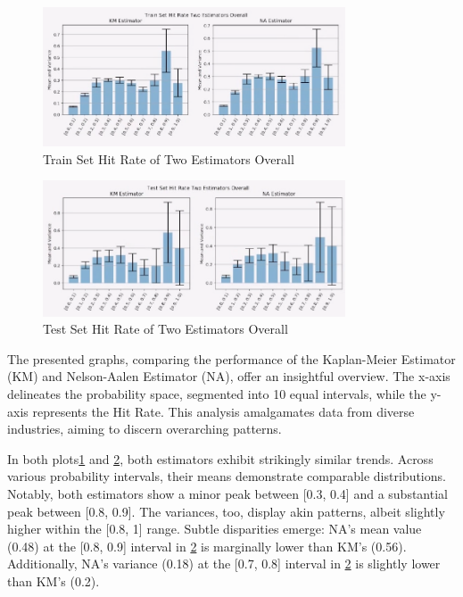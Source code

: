 \begin{figure}[H]
    \centering
    \includegraphics[width=0.8\textwidth]{figures/jpm/10. Train Set Hit Rate Two Estimators Overall.png}
    \caption{Train Set Hit Rate of Two Estimators Overall}
    \label{fig:train_hit_rate_overall}
\end{figure}

\begin{figure}[H]
    \centering
    \includegraphics[width=0.8\textwidth]{figures/jpm/12. Test Set Hit Rate Two Estimators Overall.png}
    \caption{Test Set Hit Rate of Two Estimators Overall}
    \label{fig:test_hit_rate_overall}
\end{figure}

The presented graphs, comparing the performance of the Kaplan-Meier Estimator (KM) and Nelson-Aalen Estimator (NA), offer an insightful overview. The x-axis delineates the probability space, segmented into 10 equal intervals, while the y-axis represents the Hit Rate. This analysis amalgamates data from diverse industries, aiming to discern overarching patterns.

In both plots\ref{fig:train_hit_rate_overall} and \ref{fig:test_hit_rate_overall}, both estimators exhibit strikingly similar trends. Across various probability intervals, their means demonstrate comparable distributions. Notably, both estimators show a minor peak between [0.3, 0.4] and a substantial peak between [0.8, 0.9]. The variances, too, display akin patterns, albeit slightly higher within the [0.8, 1] range. Subtle disparities emerge: NA's mean value (0.48) at the [0.8, 0.9] interval in \ref{fig:test_hit_rate_overall} is marginally lower than KM's (0.56). Additionally, NA's variance (0.18) at the [0.7, 0.8] interval in \ref{fig:test_hit_rate_overall} is slightly lower than KM's (0.2).

